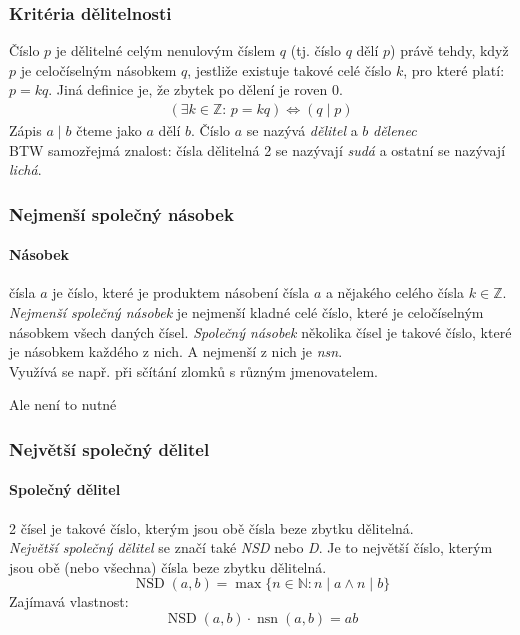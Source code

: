 \documentclass[12pt]{article}
\begin{document}
\subsubsection{Kritéria dělitelnosti}
Číslo $p$ je dělitelné celým nenulovým číslem $q$ (tj. číslo $q$ dělí $p$) právě tehdy, když $p$ je celočíselným násobkem $q$, jestliže existuje takové celé číslo $k$, pro které platí: $p = kq$. Jiná definice je, že zbytek po dělení je roven 0.
\begin{align}
( \exists k \in \mathbb{Z}: \, p = kq) \iff ( q \mid p)
\end{align}
Zápis $a \mid b$ čteme jako $a$ dělí $b$. Číslo $a$ se nazývá \emph{dělitel} a $b$ \emph{dělenec}
\\BTW samozřejmá znalost: čísla dělitelná 2 se nazývají \emph{sudá} a ostatní se nazývají \emph{lichá}.
\subsubsection{Nejmenší společný násobek}
\paragraph{Násobek} čísla $a$ je číslo, které je produktem násobení čísla $a$ a nějakého celého čísla $k \in \mathbb{Z}$.\\
\emph{Nejmenší společný násobek} je nejmenší kladné celé číslo, které je celočíselným násobkem  všech daných čísel. \emph{Společný násobek} několika čísel je takové číslo, které je násobkem každého z nich. A nejmenší z nich je \emph{nsn}.\\
Využívá se např. při sčítání zlomků s různým jmenovatelem. \begin{scriptsize} Ale není to nutné \end{scriptsize}
\subsubsection{Největší společný dělitel}
\paragraph{Společný dělitel} 2 čísel je takové číslo, kterým jsou obě čísla beze zbytku dělitelná.\\
\emph{Největší společný dělitel} se značí také \emph{NSD} nebo \emph{D}. Je to největší číslo, kterým jsou obě (nebo všechna) čísla beze zbytku dělitelná.
\begin{equation}
\operatorname {NSD} (a,b)=\max\{n\in \mathbb {N} :n\mid a\wedge n\mid b\}
\end{equation}
Zajímavá vlastnost:
\begin{equation}
 \operatorname {NSD} (a,b) \cdot \operatorname {nsn} (a,b)=ab
\end{equation}
\end{document}

